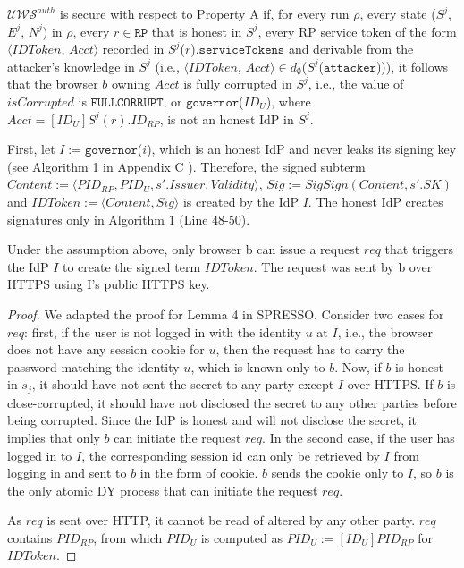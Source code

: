 
\begin{definition}
$\mathcal{UWS}^{auth}$ is secure with respect to Property A if, for every run $\rho$, every state ($S^j$, $E^j$, $N^j$) in $\rho$, every $r \in \mathtt{RP}$ that is honest in $S^j$, every RP service token of the form $\langle IDToken$, $Acct \rangle$ recorded in $S^j$($r$).$\mathtt{serviceTokens}$ and derivable from the attacker's knowledge in $S^j$ (i.e., $\langle IDToken$, $Acct \rangle \in d_{\emptyset}$($S^j$($\mathtt{attacker}$))), it follows that the browser $b$ owning $Acct$ is fully corrupted in $S^j$, i.e., the value of $isCorrupted$ is $\mathtt{FULLCORRUPT}$, or $\mathtt{governor}$($ID_U$), where $Acct=[ID_U]S^j(r).ID_{RP}$, is not an honest IdP in $S^j$.
\end{definition}

First, let $I:=\mathtt{governor}$($i$), which is an honest IdP and never leaks its signing key (see Algorithm 1 in Appendix C%
). Therefore, the signed subterm $Content:= \langle PID_{RP}, PID_U, s'.Issuer, Validity \rangle$, $Sig:= SigSign(Content, s'.SK)$ and $IDToken:= \langle Content, Sig \rangle$ is created by the IdP $I$.  The honest IdP creates signatures only in Algorithm 1 (Line 48-50).%

\begin{lemma}
\label{lemma-user-request}
Under the assumption above, only browser b can issue a request $req$ that triggers the IdP $I$ to create the signed term $IDToken$. The request was sent by b over HTTPS using I's public HTTPS key.
\end{lemma}

\begin{proof}
We adapted the proof for Lemma 4 in SPRESSO. 
Consider two cases for $req$: first, if the user is not logged in with the identity $u$ at $I$, i.e., the browser does not have any session cookie for $u$, then the request has to carry the password matching the identity $u$, which is known only to $b$. Now, if $b$ is honest in $s_j$, it should have not sent the secret to any party except $I$ over HTTPS. If $b$ is close-corrupted, it should have not disclosed the secret to any other parties before being corrupted. Since the IdP is honest and will not disclose the secret, it implies that only $b$ can initiate the request $req$. In the second case, if the user has logged in to $I$, the corresponding session id can only be retrieved by $I$ from logging in and sent to $b$ in the form of cookie. $b$ sends the cookie only to $I$, so $b$ is the only atomic DY process that can initiate the request $req$.

As $req$ is sent over HTTP, it cannot be read of altered by any other party. $req$ contains $PID_{RP}$, from which $PID_U$ is computed as $PID_U:=[ID_U]PID_{RP}$ for $IDToken$.
\end{proof}

